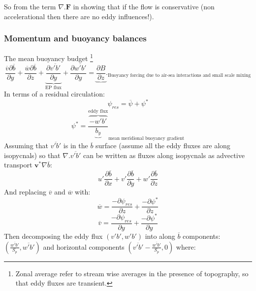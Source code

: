 So from the term $\nabla . \textbf{F}$ in  showing that if the flow is conservative (non accelerational then there are no eddy influences!).

\subsubsection*{Momentum and buoyancy balances}

The mean buoyancy budget \footnote{Zonal average refer to stream wise averages in the presence of topography, so that eddy fluxes are transient.}
\begin{equation}
\frac{\overline{v}\partial \overline{b}}{\partial y} + \frac{\overline{w}\partial \overline{b}}{\partial z} + \underbrace{\frac{\partial \overline{v'b'}}{\partial y}}_\text{EP flux} + \frac{\partial \overline{w'b'}}{\partial y} = \underbrace{\frac{\partial B}{\partial z}}._\text{Buoyancy forcing due to air-sea interactions and small scale mixing}
\end{equation}
In terms of a residual circulation:
\begin{equation}
\psi _{res} = \overline{\psi} +\psi ^*
\end{equation}
\begin{equation}
\psi ^*=\frac{\overbrace{-w'b'}^\text{eddy flux}}{\underbrace{b_y}}_\text{mean meridional buoyancy gradient}
\end{equation}
Assuming that $\overline{v'b'}$ is in the $\overline{b}$ surface (assume all the eddy fluxes are along isopycnals) so that $\nabla . \overline{v'b'}$ can be written as fluxes along isopycnals as advective transport $\textbf{v}^* \nabla \overline{b}$:
\begin{equation}
u' \frac{\partial \overline{b}}{\partial x} + v' \frac{\partial \overline{b}}{\partial y} + w' \frac{\partial \overline{b}}{\partial z} 
\end{equation}
And replacing $\overline{v}$ and $\overline{w}$ with:
\begin{equation*}
\overline{w} = \frac{- \partial \psi_{res}}{\partial z} + \frac{- \partial \psi ^*}{\partial z} 
\end{equation*}
\begin{equation*}
\overline{v} = \frac{- \partial \psi_{res}}{\partial y} + \frac{- \partial \psi ^*}{\partial y} 
\end{equation*}
Then decomposing the eddy flux $(v'b',w'b')$ into along $\overline{b}$ components: $(\frac{\overline{w'b'}}{S_p},\overline{w'b'})$ and horizontal components $(\overline{v'b'}-\frac{\overline{w'b'}}{S_p},0)$  where:
